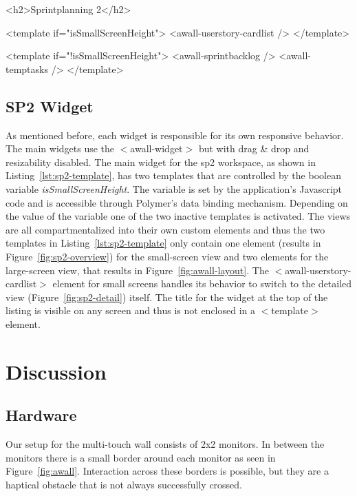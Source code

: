 \documentclass{sigchi}
\begin{document}
\begin{code}[caption={How the \gls{sp2} main widget decides which view to show.},label=lst:sp2-template]
	<h2>Sprintplanning 2</h2>
	
	<template if="{{isSmallScreenHeight}}">
	<awall-userstory-cardlist />
	</template>
	
	<template if="{{!isSmallScreenHeight}}">
	<awall-sprintbacklog />
	<awall-temptasks />
	</template>
\end{code}

\subsection{SP2 Widget}
As mentioned before, each widget is responsible for its own responsive behavior.
The main widgets use the $<$awall-widget$>$ but with drag \& drop and resizability disabled.
The main widget for the \gls{sp2} workspace, as shown in Listing~\ref{lst:sp2-template}, has two templates that are controlled by the boolean variable \textit{isSmallScreenHeight}.
The variable is set by the application's Javascript code and is accessible through Polymer's data binding mechanism.
Depending on the value of the variable one of the two inactive templates is activated.
The views are all compartmentalized into their own custom elements and thus the two templates in Listing~\ref{lst:sp2-template} only contain one element (results in Figure~\ref{fig:sp2-overview}) for the small-screen view and two elements for the large-screen view, that results in Figure~\ref{fig:awall-layout}.
The $<$awall-userstory-cardlist$>$ element for small screens handles its behavior to switch to the detailed view (Figure~\ref{fig:sp2-detail}) itself.
The title for the widget at the top of the listing is visible on any screen and thus is not enclosed in a $<$template$>$ element.


\section{Discussion}

\subsection{Hardware}
Our setup for the multi-touch wall consists of 2x2 monitors.
In between the monitors there is a small border around each monitor as seen in Figure~\ref{fig:awall}.
Interaction across these borders is possible, but they are a haptical obstacle that is not always successfully crossed.
\end{document}
